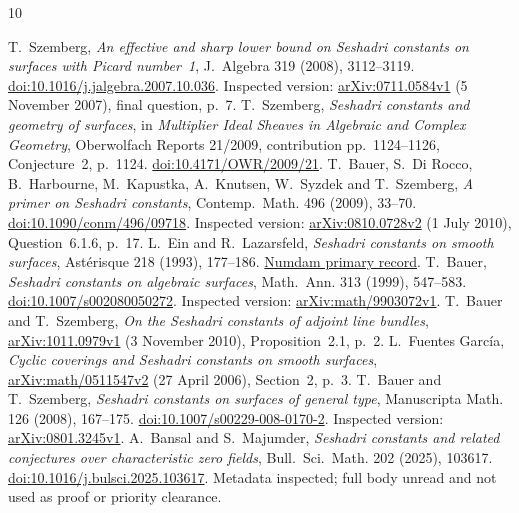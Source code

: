 \documentclass[11pt]{article}
\begin{document}
\begin{thebibliography}{10}
\raggedright
{} T.~Szemberg, \emph{An effective and sharp lower bound on
Seshadri constants on surfaces with Picard number~1}, J.~Algebra
319 (2008), 3112--3119.
\href{https://doi.org/10.1016/j.jalgebra.2007.10.036}{doi:10.1016/j.jalgebra.2007.10.036}.
Inspected version: \href{https://arxiv.org/abs/0711.0584v1}{arXiv:0711.0584v1}
(5 November 2007), final question, p.~7.
 T.~Szemberg, \emph{Seshadri constants and geometry of surfaces},
in \emph{Multiplier Ideal Sheaves in Algebraic and Complex Geometry},
Oberwolfach Reports 21/2009, contribution pp.~1124--1126, Conjecture~2, p.~1124.
\href{https://doi.org/10.4171/OWR/2009/21}{doi:10.4171/OWR/2009/21}.
 T.~Bauer, S.~Di Rocco, B.~Harbourne, M.~Kapustka,
A.~Knutsen, W.~Syzdek and T.~Szemberg, \emph{A primer on Seshadri constants},
Contemp.~Math. 496 (2009), 33--70.
\href{https://doi.org/10.1090/conm/496/09718}{doi:10.1090/conm/496/09718}.
Inspected version: \href{https://arxiv.org/abs/0810.0728v2}{arXiv:0810.0728v2}
(1 July 2010), Question~6.1.6, p.~17.
 L.~Ein and R.~Lazarsfeld, \emph{Seshadri constants on smooth
surfaces}, Ast\'erisque 218 (1993), 177--186.
\href{https://numdam.org/item/AST_1993__218__177_0/}{Numdam primary record}.
 T.~Bauer, \emph{Seshadri constants on algebraic surfaces},
Math.~Ann. 313 (1999), 547--583.
\href{https://doi.org/10.1007/s002080050272}{doi:10.1007/s002080050272}.
Inspected version: \href{https://arxiv.org/abs/math/9903072v1}{arXiv:math/9903072v1}.
 T.~Bauer and T.~Szemberg, \emph{On the Seshadri constants
of adjoint line bundles}, \href{https://arxiv.org/abs/1011.0979v1}{arXiv:1011.0979v1}
(3 November 2010), Proposition~2.1, p.~2.
 L.~Fuentes Garc\'ia, \emph{Cyclic coverings and Seshadri
constants on smooth surfaces},
\href{https://arxiv.org/abs/math/0511547v2}{arXiv:math/0511547v2}
(27 April 2006), Section~2, p.~3.
 T.~Bauer and T.~Szemberg, \emph{Seshadri constants on
surfaces of general type}, Manuscripta Math. 126 (2008), 167--175.
\href{https://doi.org/10.1007/s00229-008-0170-2}{doi:10.1007/s00229-008-0170-2}.
Inspected version: \href{https://arxiv.org/abs/0801.3245v1}{arXiv:0801.3245v1}.
 A.~Bansal and S.~Majumder, \emph{Seshadri constants
and related conjectures over characteristic zero fields}, Bull.~Sci.~Math.
202 (2025), 103617.
\href{https://doi.org/10.1016/j.bulsci.2025.103617}{doi:10.1016/j.bulsci.2025.103617}.
Metadata inspected; full body unread and not used as proof or priority clearance.
\end{thebibliography}
\end{document}
